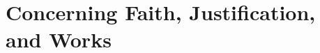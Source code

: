\documentclass[../main.tex]{subfiles}
\begin{document}
	
	\chapter{Concerning Faith, Justification, and Works}
	
	
	
	\theendnotes
	\setcounter{endnote}{0}
\end{document}
